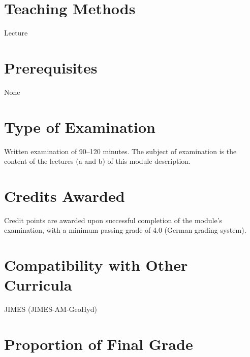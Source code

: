 \documentclass[
  letterpaper,
  10pt,
  openany]{book}
\begin{document}
\section*{Teaching Methods}\label{teaching-methods}


Lecture

\section*{Prerequisites}\label{prerequisites}


None

\section*{Type of Examination}\label{type-of-examination}


Written examination of 90--120 minutes. The subject of examination is
the content of the lectures (a and b) of this module description.

\section*{Credits Awarded}\label{credits-awarded}


Credit points are awarded upon successful completion of the module's
examination, with a minimum passing grade of 4.0 (German grading
system).

\section*{Compatibility with Other
Curricula}\label{compatibility-with-other-curricula}


JIMES (JIMES-AM-GeoHyd)

\section*{Proportion of Final Grade}\label{proportion-of-final-grade}
\end{document}
